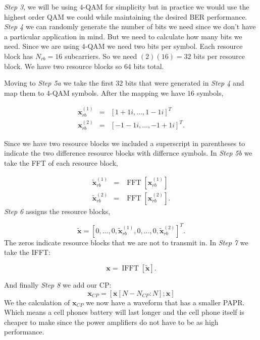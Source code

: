 \emph{Step 3}, we will be using $4$-\ac{QAM} for simplicity but in practice we would use the highest order \ac{QAM} we could while maintaining the desired \ac{BER} performance. \emph{Step 4} we can randomly generate the number of bits we need since we don't have a particular application in mind. But we need to calculate how many bits we need. Since we are using $4$-\ac{QAM} we need two bits per symbol. Each resource block has $N_{rb} = 16$ subcarriers. So we need $(2)(16)=32$ bits per resource block. We have two resource blocks so $64$ bits total.

Moving to \emph{Step 5a} we take the first $32$ bits that were generated in \emph{Step 4} and map them to $4$-\ac{QAM} symbols. After the mapping we have $16$ symbols,

\begin{eqnarray}
\mathbf{x}_{rb}^{(1)}&=&[1+1i,\dots,1-1i]^T\\
\mathbf{x}_{rb}^{(2)}&=&[-1-1i,\dots,-1+1i]^T.
\end{eqnarray}
\noindent

Since we have two resource blocks we included a superscript in parentheses to indicate the two difference resource blocks with differnce symbols. In \emph{Step 5b} we take the \ac{FFT} of each resource block,

\begin{eqnarray}
\tilde{\mathbf{x}}_{rb}^{(1)}&=&\operatorname{FFT}\left[\mathbf{x}_{rb}^{(1)}\right]\\
\tilde{\mathbf{x}}_{rb}^{(2)}&=&\operatorname{FFT}\left[\mathbf{x}_{rb}^{(2)}\right].
\end{eqnarray} 
\noindent
\emph{Step 6} assigns the resource blocks,

\begin{equation}
\tilde{\mathbf{x}}=[0,\dots,0,\tilde{\mathbf{x}}_{rb}^{(1)},0,\dots,0,\tilde{\mathbf{x}}_{rb}^{(2)}]^T.
\end{equation}
\noindent 
The zeros indicate resource blocks that we are not to transmit in. In \emph{Step 7} we take the \ac{IFFT}:

\begin{equation}
\mathbf{x}=\operatorname{IFFT}\left[\tilde{\mathbf{x}}\right].
\end{equation}
\noindent

And finally \emph{Step 8} we add our \ac{CP}:
\begin{equation}
\mathbf{x}_{CP}=[\mathbf{x}[N-N_{CP}:N]; \mathbf{x}]
\end{equation}
\noindent 
We the calculation of $\mathbf{x}_{CP}$ we now have a waveform that has a smaller \ac{PAPR}. Which means a cell phones battery will last longer and the cell phone itself is cheaper to make since the power amplifiers do not have to be as high performance. 
	
